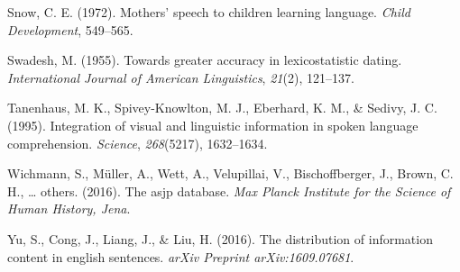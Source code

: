\documentclass[10pt, letterpaper]{article}
\begin{document}
\leavevmode\hypertarget{ref-snow1972}{}%
Snow, C. E. (1972). Mothers' speech to children learning language.
\emph{Child Development}, 549--565.

\leavevmode\hypertarget{ref-swadesh1955}{}%
Swadesh, M. (1955). Towards greater accuracy in lexicostatistic dating.
\emph{International Journal of American Linguistics}, \emph{21}(2),
121--137.

\leavevmode\hypertarget{ref-tanenhaus1995}{}%
Tanenhaus, M. K., Spivey-Knowlton, M. J., Eberhard, K. M., \& Sedivy, J.
C. (1995). Integration of visual and linguistic information in spoken
language comprehension. \emph{Science}, \emph{268}(5217), 1632--1634.

\leavevmode\hypertarget{ref-wichmann2016}{}%
Wichmann, S., Müller, A., Wett, A., Velupillai, V., Bischoffberger, J.,
Brown, C. H., \ldots{} others. (2016). The asjp database. \emph{Max
Planck Institute for the Science of Human History, Jena}.

\leavevmode\hypertarget{ref-yu2016}{}%
Yu, S., Cong, J., Liang, J., \& Liu, H. (2016). The distribution of
information content in english sentences. \emph{arXiv Preprint
arXiv:1609.07681}.


\end{document}
